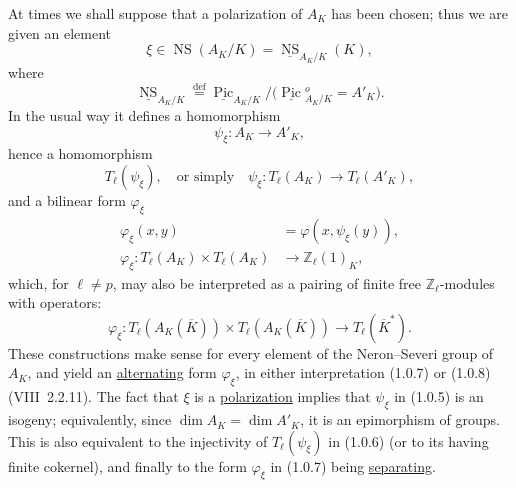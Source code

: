 At times we shall suppose that a polarization of $A_K$ has been chosen;
thus we are given an element
\begin{equation}\tag{1.0.4}
 \xi\in\operatorname{NS}(A_K/K)
 =\underline{\operatorname{NS}}_{A_K/K}(K),
\end{equation}
where
\[
 \underline{\operatorname{NS}}_{A_K/K}
 \overset{\mathrm{def}}{=}
 \underline{\operatorname{Pic}}_{A_K/K}/
 \bigl(\underline{\operatorname{Pic}}{}^o_{A_K/K}=A'_K\bigr).
\]
In the usual way it defines a homomorphism
\begin{equation}\tag{1.0.5}
 \psi_\xi:A_K\longrightarrow A'_K,
\end{equation}
hence a homomorphism
\begin{equation}\tag{1.0.6}
 T_\ell(\psi_\xi),\quad\text{or simply}\quad
 \psi_\xi:T_\ell(A_K)\longrightarrow T_\ell(A'_K),
\end{equation}
and a bilinear form $\varphi_\xi$
\begin{equation}\tag{1.0.7}
 \begin{split}
 \varphi_\xi(x,y)&=\varphi(x,\psi_\xi(y)),\\
 \varphi_\xi:T_\ell(A_K)\times T_\ell(A_K)
 &\longrightarrow\mathbb Z_\ell(1)_K,
 \end{split}
\end{equation}
which, for $\ell\ne p$, may also be interpreted as a pairing of
finite free $\mathbb Z_\ell$-modules with operators:
\begin{equation}\tag{1.0.8}
 \varphi_\xi:T_\ell(A_K(\overline K))\times
 T_\ell(A_K(\overline K))\longrightarrow T_\ell(\overline K^*).
\end{equation}
These constructions make sense for every element of the
Neron--Severi group of $A_K$, and yield an \underline{alternating} form
$\varphi_\xi$, in either interpretation (1.0.7) or (1.0.8)
(VIII~2.2.11).  The fact that $\xi$ is a \underline{polarization}
implies that $\psi_\xi$ in (1.0.5) is an isogeny; equivalently, since
$\dim A_K=\dim A'_K$, it is an epimorphism of groups.  This is also
equivalent to the injectivity of $T_\ell(\psi_\xi)$ in (1.0.6) (or to
its having finite cokernel), and finally to the form $\varphi_\xi$ in
(1.0.7) being \underline{separating}.

